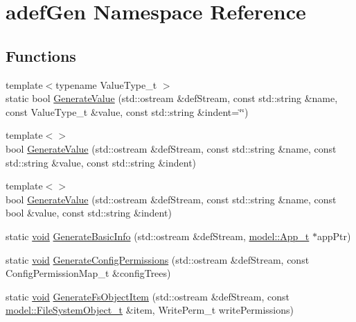 \hypertarget{namespaceadef_gen}{}\section{adef\+Gen Namespace Reference}
\label{namespaceadef_gen}
\subsection*{Functions}
\begin{DoxyCompactItemize}
\item 
{\footnotesize template$<$typename Value\+Type\+\_\+t $>$ }\\static bool \hyperlink{namespaceadef_gen_a0f0a769bcfa349d0693d9610d32c7e07}{Generate\+Value} (std\+::ostream \&def\+Stream, const std\+::string \&name, const Value\+Type\+\_\+t \&value, const std\+::string \&indent=\char`\"{}\char`\"{})
\item 
{\footnotesize template$<$$>$ }\\bool \hyperlink{namespaceadef_gen_ac499538143e5b9d3eecc82e340d23942}{Generate\+Value} (std\+::ostream \&def\+Stream, const std\+::string \&name, const std\+::string \&value, const std\+::string \&indent)
\item 
{\footnotesize template$<$$>$ }\\bool \hyperlink{namespaceadef_gen_ae3643b96f07434e2012be131f5c15fe3}{Generate\+Value} (std\+::ostream \&def\+Stream, const std\+::string \&name, const bool \&value, const std\+::string \&indent)
\item 
static \hyperlink{_t_e_m_p_l_a_t_e__cdef_8h_ac9c84fa68bbad002983e35ce3663c686}{void} \hyperlink{namespaceadef_gen_aeadd90e1308b1ceed76b3f69be2412a6}{Generate\+Basic\+Info} (std\+::ostream \&def\+Stream, \hyperlink{structmodel_1_1_app__t}{model\+::\+App\+\_\+t} $\ast$app\+Ptr)
\item 
static \hyperlink{_t_e_m_p_l_a_t_e__cdef_8h_ac9c84fa68bbad002983e35ce3663c686}{void} \hyperlink{namespaceadef_gen_af343b98f9cddd09e18c259616baf6481}{Generate\+Config\+Permissions} (std\+::ostream \&def\+Stream, const Config\+Permission\+Map\+\_\+t \&config\+Trees)
\item 
static \hyperlink{_t_e_m_p_l_a_t_e__cdef_8h_ac9c84fa68bbad002983e35ce3663c686}{void} \hyperlink{namespaceadef_gen_a94ccb4e05e02b705c6601be1f69bf1c9}{Generate\+Fs\+Object\+Item} (std\+::ostream \&def\+Stream, const \hyperlink{structmodel_1_1_file_system_object__t}{model\+::\+File\+System\+Object\+\_\+t} \&item, Write\+Perm\+\_\+t write\+Permissions)
\item 

\end{DoxyCompactItemize}
